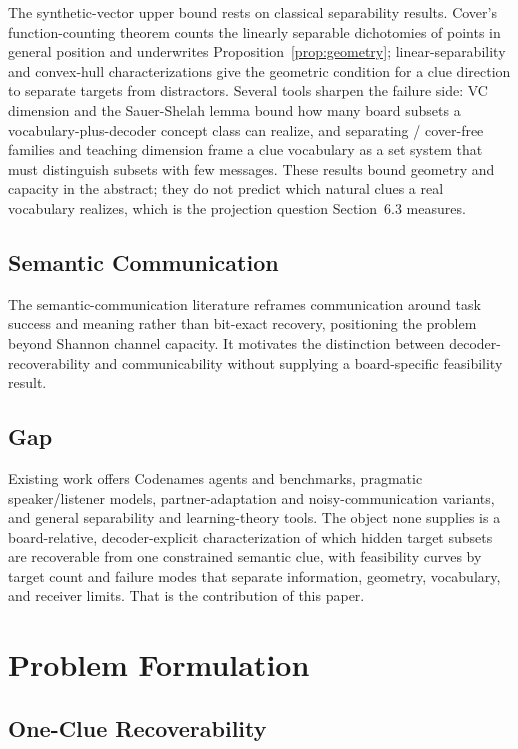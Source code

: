\documentclass[11pt]{article}
\begin{document}
The synthetic-vector upper bound rests on classical separability results. Cover's
function-counting theorem \citep{cover1965geometrical} counts the linearly
separable dichotomies of points in general position and underwrites
Proposition~\ref{prop:geometry}; linear-separability and convex-hull
characterizations give the geometric condition for a clue direction to separate
targets from distractors. Several tools sharpen the failure side: VC dimension
and the Sauer-Shelah lemma bound how many board subsets a vocabulary-plus-decoder
concept class can realize, and separating / cover-free families and teaching
dimension frame a clue vocabulary as a set system that must distinguish subsets
with few messages. These results bound geometry and capacity in the abstract;
they do not predict which natural clues a real vocabulary realizes, which is the
projection question Section~6.3 measures.

\subsection{Semantic Communication}

The semantic-communication literature reframes communication around task success
and meaning rather than bit-exact recovery, positioning the problem beyond
Shannon channel capacity. It motivates the distinction between
decoder-recoverability and communicability without supplying a board-specific
feasibility result.

\subsection{Gap}

Existing work offers Codenames agents and benchmarks, pragmatic speaker/listener
models, partner-adaptation and noisy-communication variants, and general
separability and learning-theory tools. The object none supplies is a
board-relative, decoder-explicit characterization of which hidden target subsets
are recoverable from one constrained semantic clue, with feasibility curves by
target count and failure modes that separate information, geometry, vocabulary,
and receiver limits. That is the contribution of this paper.

\section{Problem Formulation}\label{sec:problem}

\subsection{One-Clue Recoverability}
\end{document}
